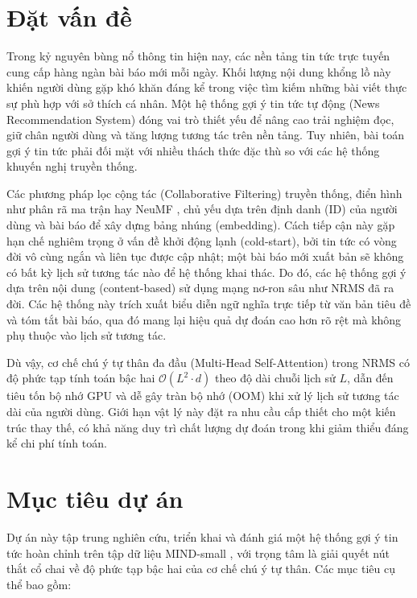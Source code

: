 \documentclass[../BTL.tex]{subfiles}
\begin{document}
\section{Đặt vấn đề}

Trong kỷ nguyên bùng nổ thông tin hiện nay, các nền tảng tin tức trực tuyến cung cấp hàng ngàn bài báo mới mỗi ngày. Khối lượng nội dung khổng lồ này khiến người dùng gặp khó khăn đáng kể trong việc tìm kiếm những bài viết thực sự phù hợp với sở thích cá nhân. Một hệ thống gợi ý tin tức tự động (News Recommendation System) đóng vai trò thiết yếu để nâng cao trải nghiệm đọc, giữ chân người dùng và tăng lượng tương tác trên nền tảng. Tuy nhiên, bài toán gợi ý tin tức phải đối mặt với nhiều thách thức đặc thù so với các hệ thống khuyến nghị truyền thống.

Các phương pháp lọc cộng tác (Collaborative Filtering) truyền thống, điển hình như phân rã ma trận hay NeuMF \cite{he2017neumf}, chủ yếu dựa trên định danh (ID) của người dùng và bài báo để xây dựng bảng nhúng (embedding). Cách tiếp cận này gặp hạn chế nghiêm trọng ở vấn đề khởi động lạnh (cold-start), bởi tin tức có vòng đời vô cùng ngắn và liên tục được cập nhật; một bài báo mới xuất bản sẽ không có bất kỳ lịch sử tương tác nào để hệ thống khai thác. Do đó, các hệ thống gợi ý dựa trên nội dung (content-based) sử dụng mạng nơ-ron sâu như NRMS \cite{wu2019nrms} đã ra đời. Các hệ thống này trích xuất biểu diễn ngữ nghĩa trực tiếp từ văn bản tiêu đề và tóm tắt bài báo, qua đó mang lại hiệu quả dự đoán cao hơn rõ rệt mà không phụ thuộc vào lịch sử tương tác.

Dù vậy, cơ chế chú ý tự thân đa đầu (Multi-Head Self-Attention) trong NRMS có độ phức tạp tính toán bậc hai $\mathcal{O}(L^2 \cdot d)$ theo độ dài chuỗi lịch sử $L$, dẫn đến tiêu tốn bộ nhớ GPU và dễ gây tràn bộ nhớ (OOM) khi xử lý lịch sử tương tác dài của người dùng. Giới hạn vật lý này đặt ra nhu cầu cấp thiết cho một kiến trúc thay thế, có khả năng duy trì chất lượng dự đoán trong khi giảm thiểu đáng kể chi phí tính toán.

\section{Mục tiêu dự án}

Dự án này tập trung nghiên cứu, triển khai và đánh giá một hệ thống gợi ý tin tức hoàn chỉnh trên tập dữ liệu MIND-small \cite{wu2020mind}, với trọng tâm là giải quyết nút thắt cổ chai về độ phức tạp bậc hai của cơ chế chú ý tự thân. Các mục tiêu cụ thể bao gồm:
\end{document}
